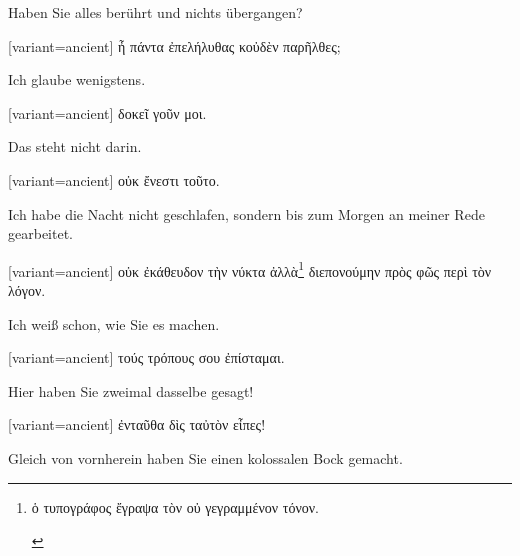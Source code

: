 Haben Sie alles berührt und nichts übergangen?

\switchcolumn

\begin{greek}[variant=ancient]%
ἦ πάντα ἐπελήλυθας κοὐδὲν παρῆλθες;

\end{greek}%
\switchcolumn*

Ich glaube wenigstens.

\switchcolumn

\begin{greek}[variant=ancient]%
δοκεῖ γοῦν μοι.

\end{greek}%
\switchcolumn*

Das steht nicht darin.

\switchcolumn

\begin{greek}[variant=ancient]%
οὐκ ἔνεστι τοῦτο.

\end{greek}%
\switchcolumn*

Ich habe die Nacht nicht geschlafen, sondern bis zum Morgen an meiner
Rede gearbeitet.

\switchcolumn

\begin{greek}[variant=ancient]%
οὐκ ἐκάθευδον τὴν νύκτα ἀλλὰ\footnote{\begin{latin}%
\textgreek[variant=ancient]{ὁ τυπογράφος ἔγραψα τὸν οὐ γεγραμμένον
τόνον.}\end{latin}%
} διεπονούμην πρὸς φῶς περὶ τὸν λόγον.

\end{greek}%
\switchcolumn*

Ich weiß schon, wie Sie es machen. 

\switchcolumn

\begin{greek}[variant=ancient]%
τούς τρόπους σου ἐπίσταμαι.

\end{greek}%
\switchcolumn*

Hier haben Sie zweimal dasselbe gesagt! 

\switchcolumn

\begin{greek}[variant=ancient]%
ἐνταῦθα δὶς ταὐτὸν εἶπες!

\end{greek}%
\switchcolumn*

Gleich von vornherein haben Sie einen kolossalen Bock gemacht. 

